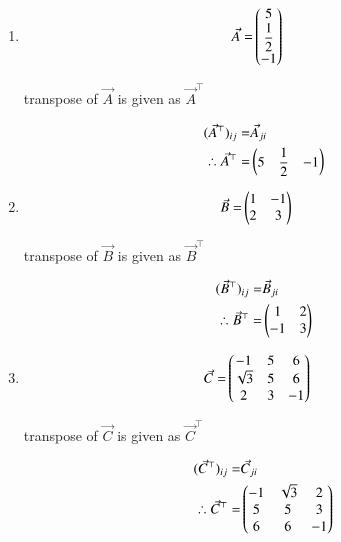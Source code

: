 \begin{enumerate}
    \item \begin{align} 
   \Vec{A}=&\begin{pmatrix}5\\ \dfrac{1}{2}\\-1\end{pmatrix}
    \end{align}
   
          transpose of $\Vec{A}$ is given as $\Vec{A}^{\top}$
    
    \begin{align} 
         (\Vec{A}^{\top})_{i j} =& \Vec{A}_{j i}\\
          \therefore \Vec{A}^{\top} = &\begin{pmatrix}5& \dfrac{1}{2}&-1\end{pmatrix}
    \end{align}
    \item \begin{align} 
    \Vec{B}=&\begin{pmatrix}1&-1\\2&3\end{pmatrix}
    \end{align}
  
          transpose of $\Vec{B}$ is given as $\Vec{B}^{\top}$
    
    \begin{align}
         (\Vec{B}^{\top})_{i j} =& \Vec{B}_{j i}\\
          \therefore \Vec{B}^{\top} = &\begin{pmatrix}1&2\\-1&3\end{pmatrix}
    \end{align}
    \item \begin{align} 
    \Vec{C}=&\begin{pmatrix}-1&5&6\\ \sqrt{3}&5&6\\2&3&-1\end{pmatrix}
    \end{align}
   
          transpose of $\Vec{C}$ is given as $\Vec{C}^{\top}$
    
    \begin{align}
         (\Vec{C}^{\top})_{i j} =& \Vec{C}_{j i}\\
          \therefore \Vec{C}^{\top} = &\begin{pmatrix}-1& \sqrt{3}&2\\ 5&5&3\\6&6&-1\end{pmatrix}
    \end{align}
\end{enumerate}